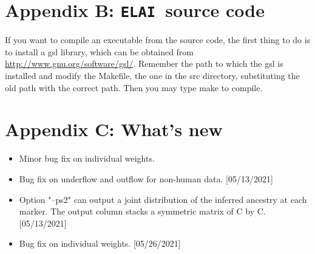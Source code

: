 \documentclass[11pt,Palatino]{article}
\def\elai{{\tt{ELAI}}~}
\begin{document}
\section{Appendix B: \elai source code}
If you want to compile an executable from the source code, the first thing to do is to install a gsl library, which can be obtained from \url{http://www.gnu.org/software/gsl/}.  Remember the path to which the gsl is installed and modify the Makefile, the one in the src directory, substituting the old path with the correct path. Then you may type make to compile. 

\section{Appendix C: What's new}
\begin{itemize}
\item Minor bug fix on individual weights.
\item Bug fix on underflow and outflow for non-human data. [05/13/2021]
\item Option "--ps2" can output a joint distribution of the inferred ancestry at each marker. The output column stacks a symmetric matrix of C by C. [05/13/2021]  
\item Bug fix on individual weights. [05/26/2021]
\end{itemize}
\end{document}

